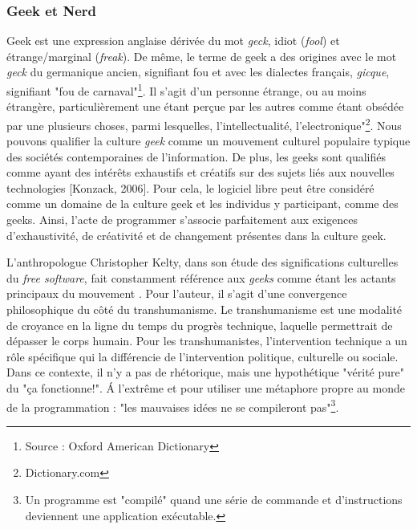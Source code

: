 \subsubsection{Geek et Nerd} \label{2.1.1.b}

Geek est une expression anglaise dérivée du mot \emph{geck}, idiot (\emph{fool}) et étrange/marginal (\emph{freak}). De même, le terme de geek a des origines avec le mot \emph{geck} du germanique ancien, signifiant fou et avec les dialectes français, \emph{gicque}, signifiant "fou de carnaval"\footnote{Source : Oxford American Dictionary}. Il s'agit d'un personne étrange, ou au moins étrangère, particulièrement une étant perçue par les autres comme étant obsédée par une plusieurs choses, parmi lesquelles, l'intellectualité, l'electronique"\footnote{Dictionary.com}. Nous pouvons qualifier la culture \emph{geek} comme un mouvement culturel populaire typique des sociétés contemporaines de l'information. De plus, les geeks sont qualifiés comme ayant des intérêts exhaustifs et créatifs sur des sujets liés aux nouvelles technologies [Konzack, 2006]. Pour cela, le logiciel libre peut être considéré comme un domaine de la culture geek et les individus y participant, comme des geeks. Ainsi, l'acte de programmer s'associe parfaitement aux exigences d'exhaustivité, de créativité et de changement présentes dans la culture geek.

L'anthropologue Christopher Kelty, dans son étude des significations culturelles du \emph{free software}, fait constamment référence aux \emph{geeks} comme étant les actants principaux du mouvement \citep{Kelty2008}. Pour l'auteur, il s'agit d'une convergence philosophique du côté du transhumanisme. Le transhumanisme est une modalité de croyance en la ligne du temps du progrès technique, laquelle permettrait de dépasser le corps humain. Pour les transhumanistes, l'intervention technique a un rôle spécifique qui la différencie de l'intervention politique, culturelle ou sociale. Dans ce contexte, il n'y a pas de rhétorique, mais une hypothétique "vérité pure" du "ça fonctionne!". \'A l'extrême et pour utiliser une métaphore propre au monde de la programmation : "les mauvaises idées ne se compileront pas"\footnote{Un programme est "compilé" quand une série de commande et d'instructions deviennent une application exécutable.}.

